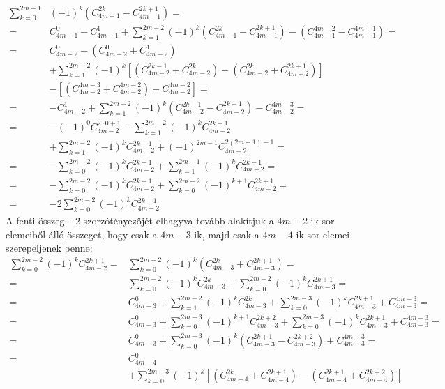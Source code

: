 \begin{solution}
\begin{align*}
\sum_{k=0}^{2m-1} & (-1)^{k}\left(C_{4m-1}^{2k}-C_{4m-1}^{2k+1}\right)=\\
= & C_{4m-1}^{0}-C_{4m-1}^{1}+\sum_{k=1}^{2m-2}(-1)^{k}\left(C_{4m-1}^{2k}-C_{4m-1}^{2k+1}\right)-\left(C_{4m-1}^{4m-2}-C_{4m-1}^{4m-1}\right)=\\
= & C_{4m-2}^{0}-\left(C_{4m-2}^{0}+C_{4m-2}^{1}\right)\\
 & +\sum_{k=1}^{2m-2}(-1)^{k}\left[\left(C_{4m-2}^{2k-1}+C_{4m-2}^{2k}\right)-\left(C_{4m-2}^{2k}+C_{4m-2}^{2k+1}\right)\right]\\
 & -\left[\left(C_{4m-2}^{4m-3}+C_{4m-2}^{4m-2}\right)-C_{4m-2}^{4m-2}\right]=\\
= & -C_{4m-2}^{1}+\sum_{k=1}^{2m-2}(-1)^{k}\left(C_{4m-2}^{2k-1}-C_{4m-2}^{2k+1}\right)-C_{4m-2}^{4m-3}=\\
= & -(-1)^{0}C_{4m-2}^{2\cdot0+1}-\sum_{k=1}^{2m-2}(-1)^{k}C_{4m-2}^{2k+1}\\
 & +\sum_{k=1}^{2m-2}(-1)^{k}C_{4m-2}^{2k-1}+(-1)^{2m-1}C_{4m-2}^{2(2m-1)-1}=\\
= & -\sum_{k=0}^{2m-2}(-1)^{k}C_{4m-2}^{2k+1}+\sum_{k=1}^{2m-1}(-1)^{k}C_{4m-2}^{2k-1}=\\
= & -\sum_{k=0}^{2m-2}(-1)^{k}C_{4m-2}^{2k+1}+\sum_{k=0}^{2m-2}(-1)^{k+1}C_{4m-2}^{2k+1}=\\
= & -2\sum_{k=0}^{2m-2}(-1)^{k}C_{4m-2}^{2k+1}
\end{align*}
A fenti összeg $-2$ szorzótényezőjét elhagyva tovább alakítjuk a
$4m-2$-ik sor elemeiből álló összeget, hogy csak a $4m-3$-ik, majd
csak a $4m-4$-ik sor elemei szerepeljenek benne: 
\begin{align*}
\sum_{k=0}^{2m-2}(-1)^{k}C_{4m-2}^{2k+1}= & \sum_{k=0}^{2m-2}(-1)^{k}\left(C_{4m-3}^{2k}+C_{4m-3}^{2k+1}\right)=\\
= & \sum_{k=0}^{2m-2}(-1)^{k}C_{4m-3}^{2k}+\sum_{k=0}^{2m-2}(-1)^{k}C_{4m-3}^{2k+1}=\\
= & C_{4m-3}^{0}+\sum_{k=1}^{2m-2}(-1)^{k}C_{4m-3}^{2k}+\sum_{k=0}^{2m-3}(-1)^{k}C_{4m-3}^{2k+1}+C_{4m-3}^{4m-3}=\\
= & C_{4m-3}^{0}+\sum_{k=0}^{2m-3}(-1)^{k+1}C_{4m-3}^{2k+2}+\sum_{k=0}^{2m-3}(-1)^{k}C_{4m-3}^{2k+1}+C_{4m-3}^{4m-3}=\\
= & C_{4m-3}^{0}+\sum_{k=0}^{2m-3}(-1)^{k}\left(C_{4m-3}^{2k+1}-C_{4m-3}^{2k+2}\right)+C_{4m-3}^{4m-3}=\\
= & C_{4m-4}^{0}\\
 & +\sum_{k=0}^{2m-3}(-1)^{k}\left[\left(C_{4m-4}^{2k}+C_{4m-4}^{2k+1}\right)-\left(C_{4m-4}^{2k+1}+C_{4m-4}^{2k+2}\right)\right]\\

\end{align*}
\end{solution}
